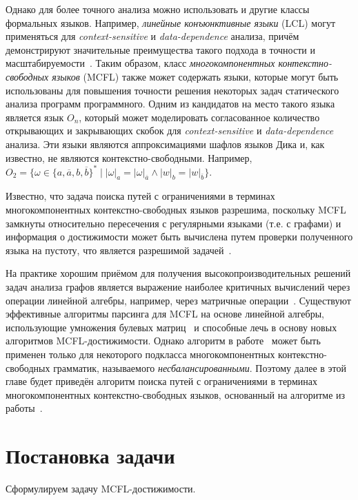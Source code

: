 Однако для более точного анализа можно использовать и другие классы формальных языков. Например, \textit{линейные конъюнктивные языки} (LCL) могут применяться для \textit{context-sensitive} и \textit{data-dependence} анализа, причём демонстрируют значительные преимущества такого подхода в точности и масштабируемости~\cite{zhang2017context}. Таким образом, класс \textit{многокомпонентных контекстно-свободных языков} (MCFL) также может содержать языки, которые могут быть использованы для повышения точности решения некоторых задач статического анализа программ программного. Одним из кандидатов на место такого языка является язык $O_n$, который может моделировать согласованное количество открывающих и закрывающих скобок для \textit{context-sensitive} и \textit{data-dependence} анализа. Эти языки являются аппроксимациями шафлов языков Дика и, как известно, не являются контекстно-свободными. Например, $O_2=\{\omega \in \{a,\overline{a},b,\overline{b}\}^* \mid |\omega|_a=|\omega|_{\overline{a}} \wedge |w|_b=|w|_{\overline{b}}\}$.


Известно, что задача поиска путей с ограничениями в терминах многокомпонентных контекстно-свободных языков разрешима, поскольку MCFL замкнуты относительно пересечения с регулярными языками (т.е. с графами) и информация о достижимости может быть вычислена путем проверки полученного языка на пустоту, что является разрешимой задачей~\cite{seki1991multiple}.

На практике хорошим приёмом для получения высокопроизводительных решений задач анализа графов является выражение наиболее критичных вычислений через операции линейной алгебры, например, через матричные операции~\cite{doi:10.1137/1.9780898719918}. Существуют эффективные алгоритмы парсинга для MCFL на основе линейной алгебры, использующие умножения булевых матриц~\cite{nakanishi1997efficient,cohen2016parsing} и способные лечь в основу новых алгоритмов MCFL-достижимости. Однако алгоритм в работе~\cite{cohen2016parsing} может быть применен только для некоторого подкласса многокомпонентных контекстно-свободных грамматик, называемого \textit{несбалансированными}. Поэтому далее в этой главе будет приведён алгоритм поиска путей с ограничениями в терминах многокомпонентных контекстно-свободных языков, основанный на алгоритме из работы~\cite{nakanishi1997efficient}.



\section{Постановка задачи}
Сформулируем задачу MCFL-достижимости.


